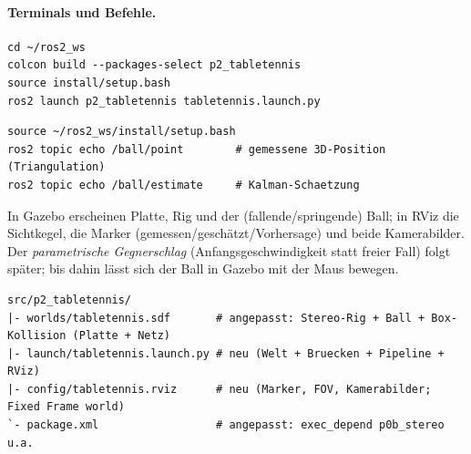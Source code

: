 \paragraph{Terminals und Befehle.}
\begin{lstlisting}[style=bash,caption={Terminal 1 -- bauen + alles starten (Gazebo + RViz + Pipeline)}]
cd ~/ros2_ws
colcon build --packages-select p2_tabletennis
source install/setup.bash
ros2 launch p2_tabletennis tabletennis.launch.py
\end{lstlisting}
\begin{lstlisting}[style=bash,caption={Terminal 2 -- Ballposition anzeigen}]
source ~/ros2_ws/install/setup.bash
ros2 topic echo /ball/point        # gemessene 3D-Position (Triangulation)
ros2 topic echo /ball/estimate     # Kalman-Schaetzung
\end{lstlisting}
\noindent In Gazebo erscheinen Platte, Rig und der (fallende/springende) Ball;
in RViz die Sichtkegel, die Marker (gemessen/geschätzt/Vorhersage) und beide
Kamerabilder. Der \emph{parametrische Gegnerschlag} (Anfangsgeschwindigkeit statt
freier Fall) folgt später; bis dahin lässt sich der Ball in Gazebo mit der Maus
bewegen.
\begin{lstlisting}[style=bash,caption={\code{ros2\_ws}-Delta nach Schritt 2 (\# neu / \# angepasst)}]
src/p2_tabletennis/
|- worlds/tabletennis.sdf       # angepasst: Stereo-Rig + Ball + Box-Kollision (Platte + Netz)
|- launch/tabletennis.launch.py # neu (Welt + Bruecken + Pipeline + RViz)
|- config/tabletennis.rviz      # neu (Marker, FOV, Kamerabilder; Fixed Frame world)
`- package.xml                  # angepasst: exec_depend p0b_stereo u.a.
\end{lstlisting}


